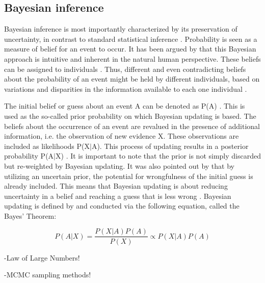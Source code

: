         \subsection{Bayesian inference}
        Bayesian inference is most importantly characterized by its preservation of uncertainty, in contrast to standard statistical inference \cite{davidson2015}. Probability is seen as a measure of belief for an event to occur. It has been argued by \cite{davidson2015}  that this Bayesian approach is intuitive and inherent in the natural human perspective. These beliefs can be assigned to individuals \cite{davidson2015}. Thus, different and even contradicting beliefs about the probability of an event might be held by different individuals, based on variations and disparities in the information available to each one individual \cite{davidson2015}.
        
        The initial belief or guess about an event A can be denoted as P(A) \cite{davidson2015}. This is used as the so-called prior probability on which Bayesian updating is based. The beliefs about the occurrence of an event are revalued in the presence of additional information, i.e. the observation of new evidence X. These observations are included as likelihoods P(X$|$A). This process of updating results in a posterior probability P(A$|$X) \cite{davidson2015}. It is important to note that the prior is not simply discarded but re-weighted by Bayesian updating. It was also pointed out by \cite{davidson2015} that by utilizing an uncertain prior, the potential for wrongfulness of the initial guess is already included. This means that Bayesian updating is about reducing uncertainty in a belief and reaching a guess that is less wrong \cite{davidson2015}.
        Bayesian updating is defined by and conducted via the following equation, called the Bayes' Theorem:
        
        \begin{equation}\label{eq:BayesTheorem}
        P(A|X) = \frac{P(X|A)P(A)}{P(X)}
        \propto P(X|A)P(A)
        \end{equation}
        
        -Law of Large Numbers!
        
        -MCMC sampling methods!
               
